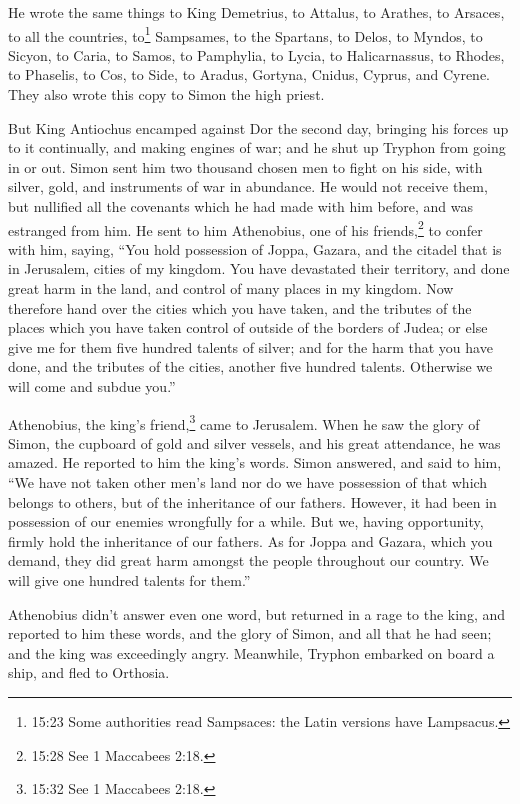  He wrote the same things to King Demetrius, to Attalus, to
Arathes, to Arsaces,  to all the countries, to\footnote{15:23
  Some authorities read Sampsaces: the Latin versions have Lampsacus.}
Sampsames, to the Spartans, to Delos, to Myndos, to Sicyon, to Caria, to
Samos, to Pamphylia, to Lycia, to Halicarnassus, to Rhodes, to Phaselis,
to Cos, to Side, to Aradus, Gortyna, Cnidus, Cyprus, and Cyrene.
 They also wrote this copy to Simon the high priest.

 But King Antiochus encamped against Dor the second day,
bringing his forces up to it continually, and making engines of war; and
he shut up Tryphon from going in or out.  Simon sent him
two thousand chosen men to fight on his side, with silver, gold, and
instruments of war in abundance.  He would not receive
them, but nullified all the covenants which he had made with him before,
and was estranged from him.  He sent to him Athenobius, one
of his friends,\footnote{15:28 See 1 Maccabees 2:18.} to confer with
him, saying, ``You hold possession of Joppa, Gazara, and the citadel
that is in Jerusalem, cities of my kingdom.  You have
devastated their territory, and done great harm in the land, and control
of many places in my kingdom.  Now therefore hand over the
cities which you have taken, and the tributes of the places which you
have taken control of outside of the borders of Judea;  or
else give me for them five hundred talents of silver; and for the harm
that you have done, and the tributes of the cities, another five hundred
talents. Otherwise we will come and subdue you.''

 Athenobius, the king's friend,\footnote{15:32 See 1
  Maccabees 2:18.} came to Jerusalem. When he saw the glory of Simon,
the cupboard of gold and silver vessels, and his great attendance, he
was amazed. He reported to him the king's words.  Simon
answered, and said to him, ``We have not taken other men's land nor do
we have possession of that which belongs to others, but of the
inheritance of our fathers. However, it had been in possession of our
enemies wrongfully for a while.  But we, having
opportunity, firmly hold the inheritance of our fathers. 
As for Joppa and Gazara, which you demand, they did great harm amongst
the people throughout our country. We will give one hundred talents for
them.''

Athenobius didn't answer even one word,  but returned in a
rage to the king, and reported to him these words, and the glory of
Simon, and all that he had seen; and the king was exceedingly angry.
 Meanwhile, Tryphon embarked on board a ship, and fled to
Orthosia.

